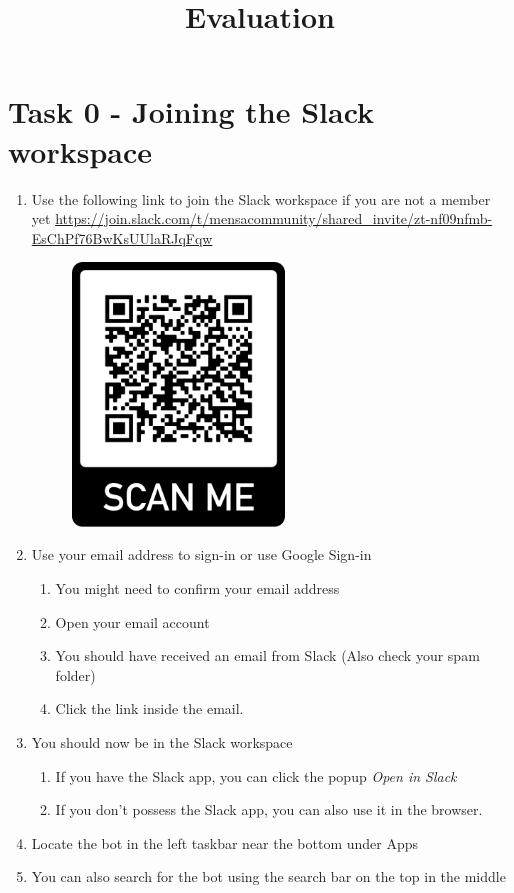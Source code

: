 


\title{Evaluation}



\maketitle

\section*{Task 0 - Joining the Slack workspace}
    
     
\begin{enumerate}
    \item Use the following link
    to join the Slack workspace if you are not a member yet
    \url{https://join.slack.com/t/mensacommunity/shared_invite/zt-nf09nfmb-EsChPf76BwKsUUlaRJqFqw}
    \begin{figure}[h]
        \centering
        \includegraphics[height=7cm]{../presentation/frame.png}
    \end{figure}
    \item Use your email address to sign-in or use Google Sign-in
    \begin{enumerate}
    \item You might need to confirm your email address
    \item Open your email account
    \item You should have received an email from Slack (Also check your spam folder)
    \item  Click the link inside the email. 
    \end{enumerate}
    \item You should now be  in the Slack workspace
    \begin{enumerate}
        \item If you have the Slack app, you can click the popup \emph{Open in Slack}
        \item If you don't possess the Slack app, you can also use it in the browser.
    \end{enumerate}
    \item Locate the bot in the left taskbar near the bottom under Apps
    \item You can also search for the bot using the search bar on the top in the middle
\end{enumerate}

